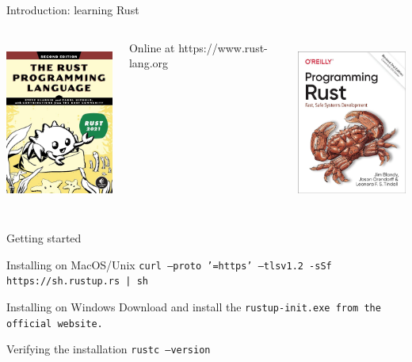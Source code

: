     \begin{frame}{Introduction: learning Rust}
        \begin{columns}[t, onlytextwidth]
            \centering
            \includegraphics[height=5.5cm, keepaspectratio]{images/rust-book.jpg}

            \small Online at https://www.rust-lang.org

            \centering
            \includegraphics[height=5.5cm, keepaspectratio]{images/programming-rust.jpg}
        \end{columns}
    \end{frame}

    \begin{frame}[containsverbatim]{Getting started}
        \small
        \begin{block}{Installing on MacOS/Unix}
            \tt{curl --proto '=https' --tlsv1.2 -sSf https://sh.rustup.rs | sh}
        \end{block}

        \begin{block}{Installing on Windows}
            Download and install the \tt{rustup-init.exe} from the official website. 
        \end{block}

        \begin{alertblock}{Verifying the installation}
            \tt{rustc --version}
        \end{alertblock}
    \end{frame}